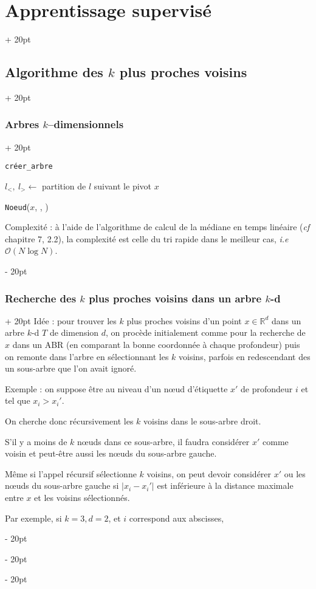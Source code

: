 \documentclass[a4paper, 12pt, twoside]{article}
\newenvironment{indalgo}[2][H]{
    \begin{algoBox}
        \begin{algorithm}[#1]
            \caption{#2}
}
{
        \end{algorithm}
    \end{algoBox}
}
\newcommand{\R}{\mathbb{R}} %
\newcommand{\abs}[1]{\left\lvert #1 \right\rvert}
\newcommand{\ind}[1][20pt]{\advance\leftskip + #1}
\newcommand{\deind}[1][20pt]{\advance\leftskip - #1}
\newenvironment{indt}[2][20pt]{#2 \par \ind[#1]}{\par \deind} %
\begin{document}
\begin{indt}{\section{Apprentissage supervisé}}
\begin{indt}{\subsection{Algorithme des $k$ plus proches voisins}}
\begin{indt}{\subsubsection{Arbres $k$--dimensionnels}}
\begin{indalgo}{\texttt{créer\_arbre}}
{{                            $l_<,\ l_> \gets$ partition de $l$ suivant le pivot $x$\;

                            \Return \texttt{Noeud}($x$, , )\;
                        }
                    }
                \end{indalgo}

                Complexité : à l'aide de l'algorithme de calcul de la médiane en temps linéaire (\textit{cf} chapitre 7, 2.2), la complexité est celle du tri rapide dans le meilleur cas, \textit{i.e} $\mathcal O(N\log N)$.
            \end{indt}

            \vspace{12pt}
            
            \begin{indt}{\subsubsection{Recherche des $k$ plus proches voisins dans un arbre $k$-d}}
                Idée : pour trouver les $k$ plus proches voisins d'un point $x \in \R^d$ dans un arbre $k$-d $T$ de dimension $d$, on procède initialement comme pour la recherche de $x$ dans un ABR (en comparant la bonne coordonnée à chaque profondeur) puis on remonte dans l'arbre en sélectionnant les $k$ voisins, parfois en redescendant des un sous-arbre que l'on avait ignoré.

                Exemple : on suppose être au niveau d'un n\oe ud d'étiquette $x'$ de profondeur $i$ et tel que $x_i > x_i'$.

                On cherche donc récursivement les $k$ voisins dans le sous-arbre droit.

                S'il y a moins de $k$ n\oe uds dans ce sous-arbre, il faudra considérer $x'$ comme voisin et peut-être aussi les n\oe uds du sous-arbre gauche.

                Même si l'appel récursif sélectionne $k$ voisins, on peut devoir considérer $x'$ ou les n\oe uds du sous-arbre gauche si $\abs{x_i - x_i'}$ est inférieure à la distance maximale entre $x$ et les voisins sélectionnés.

                Par exemple, si $k = 3, d = 2$, et $i$ correspond aux abscisses,

                \begin{center}
\end{center}
\end{indt}
\end{indt}
\end{indt}
\end{document}
